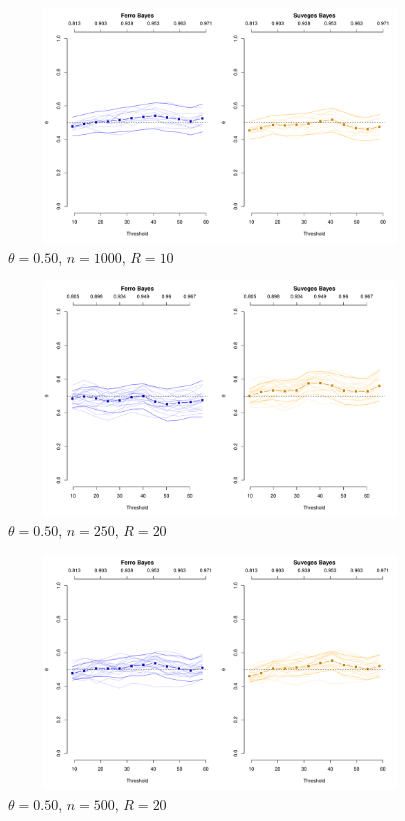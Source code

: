 \documentclass[12pt]{article}
\begin{document}
\begin{figure}
\begin{center}
\includegraphics[width=5.5in, height=2.45in]{../extremal_comparison/figs/sim_frechet_hier_50_1000_10.pdf}
\caption{$\theta=0.50$, $n=1000$, $R=10$}
\end{center}
\end{figure}

\newpage

\begin{figure}
\begin{center}
\includegraphics[width=5.5in, height=2.45in]{../extremal_comparison/figs/sim_frechet_hier_50_250_20.pdf}
\caption{$\theta=0.50$, $n=250$, $R=20$}
\end{center}
\end{figure}

\begin{figure}
\begin{center}
\includegraphics[width=5.5in, height=2.45in]{../extremal_comparison/figs/sim_frechet_hier_50_500_20.pdf}
\caption{$\theta=0.50$, $n=500$, $R=20$}
\end{center}
\end{figure}
\end{document}
